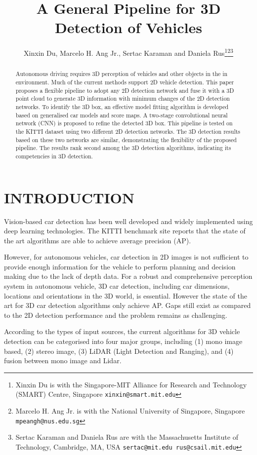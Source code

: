 \documentclass[letterpaper, 10 pt, conference]{ieeeconf}  \usepackage[
\title{\LARGE \bf
A General Pipeline for 3D Detection of Vehicles
}
\author{Xinxin Du, Marcelo H. Ang Jr., Sertac Karaman and Daniela Rus\thanks{Xinxin Du is with the Singapore-MIT Alliance for Research and Technology (SMART) Centre, Singapore {\tt\small xinxin@smart.mit.edu}}\thanks{Marcelo H. Ang Jr. is with the National University of Singapore, Singapore {\tt\small mpeangh@nus.edu.sg}}\thanks{Sertac Karaman and Daniela Rus are with the Massachusetts Institute of Technology, Cambridge, MA, USA {\tt\small sertac@mit.edu rus@csail.mit.edu}}}
\begin{document}
\maketitle



\begin{abstract}
Autonomous driving requires 3D perception of vehicles and other objects in the in environment. Much of the current methods support 2D vehicle detection. This paper proposes a flexible pipeline to adopt any 2D detection network and fuse it with a 3D point cloud to generate 3D information with minimum changes of the 2D detection networks. To identify the 3D box, an effective model fitting algorithm is developed based on generalised car models and score maps. A two-stage convolutional neural network (CNN) is proposed to refine the detected 3D box. This pipeline is tested on the KITTI dataset using two different 2D detection networks. The 3D detection results based on these two networks are similar, demonstrating the flexibility of the proposed pipeline. The results rank second among the 3D detection algorithms, indicating its competencies in 3D detection. 
\end{abstract}


\section{INTRODUCTION}
\label{sec:Introduction}
Vision-based car detection has been well developed and widely implemented using deep learning technologies. The KITTI  \cite{Geiger2012CVPR} benchmark site reports that the state of the art algorithms are able to achieve  average precision (AP). 

However, for autonomous vehicles, car detection in 2D images is not sufficient to provide enough information for the vehicle to perform planning and decision making due to the lack of depth data. For a robust and comprehensive perception system in autonomous vehicle, 3D car detection, including car dimensions, locations and orientations in the 3D world, is essential. However the state of the art for 3D car detection algorithms only achieve  AP. Gaps still exist as compared to the 2D detection performance and the problem remains as challenging.

According to the types of input sources, the current algorithms for 3D vehicle detection can be categorised into four major groups, including (1) mono image based, (2) stereo image, (3) LiDAR (Light Detection and Ranging), and (4) fusion between mono image and Lidar.
\end{document}
